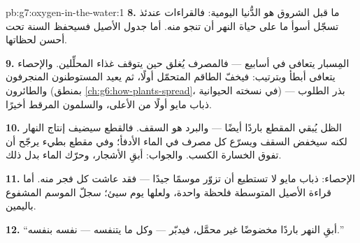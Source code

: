 \begin{solution}{pb:g7:oxygen-in-the-water:1}
\textbf{8.} ما قبل الشروق هو الدُّنيا اليومية: فالقراءات عندئذ
تسجّل أسوأ ما على حياة النهر أن تنجو منه. أما جدول الأصيل فسيحفظ
السنة تحت أحسن لحظاتها.

\textbf{9.} المِسبار يتعافى في أسابيع --- فالمصرف يُغلق حين يتوقف
غذاء المحلِّلين. والإحصاء يتعافى أبطأ وبترتيب: فيخفّ الطاقم
المتحمّل أولًا، ثم يعيد المستوطنون المنجرفون والطائرون
(بمنطق \cref{ch:g6:how-plants-spread}، في نسخته الحيوانية) بذر
 الطلوب ---  ذباب مايو أولًا من الأعلى، والسلمون
المرقط أخيرًا.

\textbf{10.} الظل يُبقي المقطع باردًا أيضًا --- والبرد هو السقف.
فالقطع سيضيف إنتاج النهار لكنه سيخفض السقف ويسرّع كل مصرف في الماء
الأدفأ؛ وفي مقطع بطيء يرجّح أن تفوق الخسارة الكسب. والجواب: أبقِ
الأشجار، وحرّك الماء بدل ذلك.

\textbf{11.} الإحصاء:  ذباب مايو لا تستطيع أن تزوّر موسمًا
جيدًا --- فقد عاشت كل فجر منه. أما قراءة الأصيل المتوسطة فلحظة
واحدة، ولعلها يوم سيئ؛  سجلّ الموسم المشفوع باليمين.

\textbf{12.} ``أبقِ النهر باردًا مخضوضًا غير محمَّل، فيدبّر
 --- وكل ما يتنفسه --- نفسه بنفسه.''
\end{solution}
